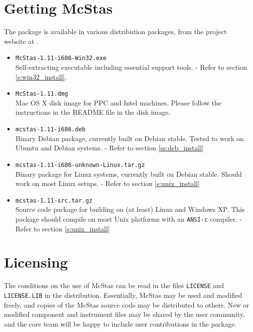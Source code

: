 \label{s:install}

\section{Getting McStas}
\label{s:obtain}
The  package is
available in various distribution packages, from the project
website at
.
\begin{itemize}
\item{\texttt{McStas-1.11-i686-Win32.exe}\\Self-extracting executable
    including essential support tools. - Refer to section
    \ref{s:win32_install}. }
\item{\texttt{McStas-1.11.dmg}\\Mac OS X disk image for PPC and Intel machines. Please follow
    the instructions in the README file in the disk image. }
\item{\texttt{mcstas-1.11-i686.deb}\\Binary Debian package, currently built on Debian stable.
   Tested to work on Ubuntu and Debian systems.
 - Refer to section \ref{ss:deb_install}}
\item{\texttt{mcstas-1.11-i686-unknown-Linux.tar.gz}\\Binary package
  for Linux systems, currently built on Debian stable.
  Should work on most Linux setups.
 - Refer to section \ref{s:unix_install}}
\item{\texttt{mcstas-1.11-src.tar.gz}\\Source code package for
    building  on
    (at least) Linux and Windows XP. This package should compile on
    most Unix platforms with an \texttt{ANSI-c} compiler. - Refer to section \ref{s:unix_install}}
\end{itemize}

\section{Licensing}
The conditions on the use of McStas can be read in the files
\verb+LICENSE+ and \verb+LICENSE.LIB+ in the distribution. Essentially,
McStas may be used and modified freely, and copies of the McStas source code
may be distributed to others.
New or modified component and instrument files may be shared by
the user community, and the core team will be happy to include user contributions in the package.

